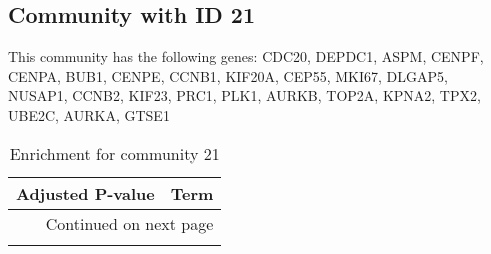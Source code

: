 \subsection*{Community with ID 21}
This community has the following genes: CDC20, DEPDC1, ASPM, CENPF, CENPA, BUB1, CENPE, CCNB1, KIF20A, CEP55, MKI67, DLGAP5, NUSAP1, CCNB2, KIF23, PRC1, PLK1, AURKB, TOP2A, KPNA2, TPX2, UBE2C, AURKA, GTSE1
\\
\begin{longtable}{p{2.4cm}p{14.5cm}}
\caption{Enrichment for community 21}\\
\toprule
Adjusted \newline P-value &                                                                                                                                                   Term \\
\midrule
\endhead
\midrule
\multicolumn{2}{r}{{Continued on next page}} \\
\midrule
\endfoot


\end{longtable}
